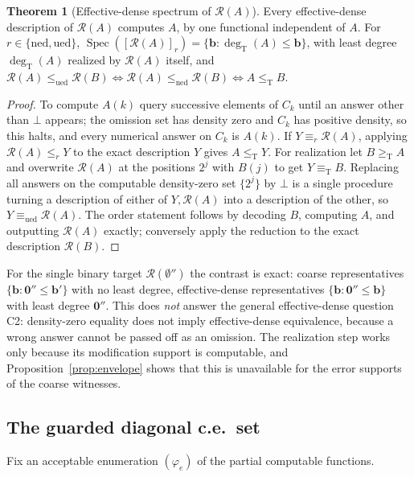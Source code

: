 \documentclass[11pt,letterpaper]{article}
\theoremstyle{definition}
\newtheorem{theorem}[definition]{Theorem}
\numberwithin{equation}{section}
\newcommand{\leT}{\le_{\mathrm T}}
\newcommand{\geT}{\ge_{\mathrm T}}
\newcommand{\eqT}{\equiv_{\mathrm T}}
\newcommand{\ned}{\mathrm{ned}}
\newcommand{\ued}{\mathrm{ued}}
\newcommand{\Spec}{\operatorname{Spec}}
\newcommand{\degT}{\deg_{\mathrm T}}
\newcommand{\Rc}{\mathcal R}
\newcommand{\zero}{\mathbf 0}
\newcommand{\src}[1]{\leavevmode{\sffamily\footnotesize\color{Steel}[#1]}}
\begin{document}
\begin{theorem}[Effective-dense spectrum of $\Rc(A)$]\label{thm:ed}\src{R3, R4}
Every effective-dense description of $\Rc(A)$ computes $A$, by one functional independent of $A$. For $r\in\{\ned,\ued\}$, $\Spec([\Rc(A)]_r)=\{\mathbf b:\degT(A)\le\mathbf b\}$, with least degree $\degT(A)$ realized by $\Rc(A)$ itself, and $\Rc(A)\le_{\ued}\Rc(B)\iff\Rc(A)\le_{\ned}\Rc(B)\iff A\leT B$.
\end{theorem}
\begin{proof}
To compute $A(k)$ query successive elements of $C_k$ until an answer other than $\bot$ appears; the omission set has density zero and $C_k$ has positive density, so this halts, and every numerical answer on $C_k$ is $A(k)$. If $Y\equiv_r\Rc(A)$, applying $\Rc(A)\le_rY$ to the exact description $Y$ gives $A\leT Y$. For realization let $B\geT A$ and overwrite $\Rc(A)$ at the positions $2^j$ with $B(j)$ to get $Y\eqT B$. Replacing all answers on the computable density-zero set $\{2^j\}$ by $\bot$ is a single procedure turning a description of either of $Y,\Rc(A)$ into a description of the other, so $Y\equiv_{\ued}\Rc(A)$. The order statement follows by decoding $B$, computing $A$, and outputting $\Rc(A)$ exactly; conversely apply the reduction to the exact description $\Rc(B)$.
\end{proof}
For the single binary target $\Rc(\emptyset'')$ the contrast is exact: coarse representatives $\{\mathbf b:\zero''\le\mathbf b'\}$ with no least degree, effective-dense representatives $\{\mathbf b:\zero''\le\mathbf b\}$ with least degree $\zero''$. This does \emph{not} answer the general effective-dense question C2: density-zero equality does not imply effective-dense equivalence, because a wrong answer cannot be passed off as an omission. The realization step works only because its modification support is computable, and Proposition~\ref{prop:envelope} shows that this is unavailable for the error supports of the coarse witnesses.

\subsection{The guarded diagonal c.e.\ set}
Fix an acceptable enumeration $(\varphi_e)$ of the partial computable functions.
\end{document}
